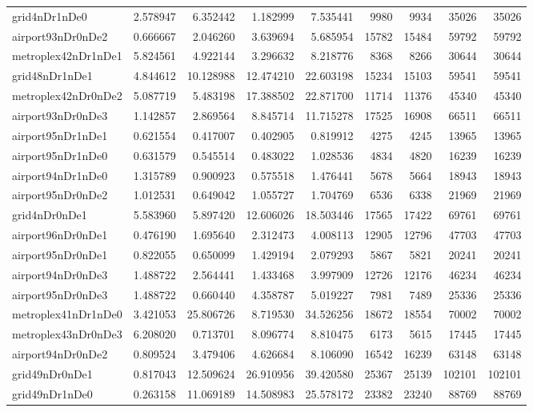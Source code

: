 \begin{longtable}{|l|r|r|r|r|r|r|r|r|}
grid4nDr1nDe0 & 2.578947 & 6.352442 & 1.182999 & 7.535441 & 9980 & 9934 & 35026 & 35026 \\
airport93nDr0nDe2 & 0.666667 & 2.046260 & 3.639694 & 5.685954 & 15782 & 15484 & 59792 & 59792 \\
metroplex42nDr1nDe1 & 5.824561 & 4.922144 & 3.296632 & 8.218776 & 8368 & 8266 & 30644 & 30644 \\
grid48nDr1nDe1 & 4.844612 & 10.128988 & 12.474210 & 22.603198 & 15234 & 15103 & 59541 & 59541 \\
metroplex42nDr0nDe2 & 5.087719 & 5.483198 & 17.388502 & 22.871700 & 11714 & 11376 & 45340 & 45340 \\
airport93nDr0nDe3 & 1.142857 & 2.869564 & 8.845714 & 11.715278 & 17525 & 16908 & 66511 & 66511 \\
airport95nDr1nDe1 & 0.621554 & 0.417007 & 0.402905 & 0.819912 & 4275 & 4245 & 13965 & 13965 \\
airport95nDr1nDe0 & 0.631579 & 0.545514 & 0.483022 & 1.028536 & 4834 & 4820 & 16239 & 16239 \\
airport94nDr1nDe0 & 1.315789 & 0.900923 & 0.575518 & 1.476441 & 5678 & 5664 & 18943 & 18943 \\
airport95nDr0nDe2 & 1.012531 & 0.649042 & 1.055727 & 1.704769 & 6536 & 6338 & 21969 & 21969 \\
grid4nDr0nDe1 & 5.583960 & 5.897420 & 12.606026 & 18.503446 & 17565 & 17422 & 69761 & 69761 \\
airport96nDr0nDe1 & 0.476190 & 1.695640 & 2.312473 & 4.008113 & 12905 & 12796 & 47703 & 47703 \\
airport95nDr0nDe1 & 0.822055 & 0.650099 & 1.429194 & 2.079293 & 5867 & 5821 & 20241 & 20241 \\
airport94nDr0nDe3 & 1.488722 & 2.564441 & 1.433468 & 3.997909 & 12726 & 12176 & 46234 & 46234 \\
airport95nDr0nDe3 & 1.488722 & 0.660440 & 4.358787 & 5.019227 & 7981 & 7489 & 25336 & 25336 \\
metroplex41nDr1nDe0 & 3.421053 & 25.806726 & 8.719530 & 34.526256 & 18672 & 18554 & 70002 & 70002 \\
metroplex43nDr0nDe3 & 6.208020 & 0.713701 & 8.096774 & 8.810475 & 6173 & 5615 & 17445 & 17445 \\
airport94nDr0nDe2 & 0.809524 & 3.479406 & 4.626684 & 8.106090 & 16542 & 16239 & 63148 & 63148 \\
grid49nDr0nDe1 & 0.817043 & 12.509624 & 26.910956 & 39.420580 & 25367 & 25139 & 102101 & 102101 \\
grid49nDr1nDe0 & 0.263158 & 11.069189 & 14.508983 & 25.578172 & 23382 & 23240 & 88769 & 88769 \\

\end{longtable}
